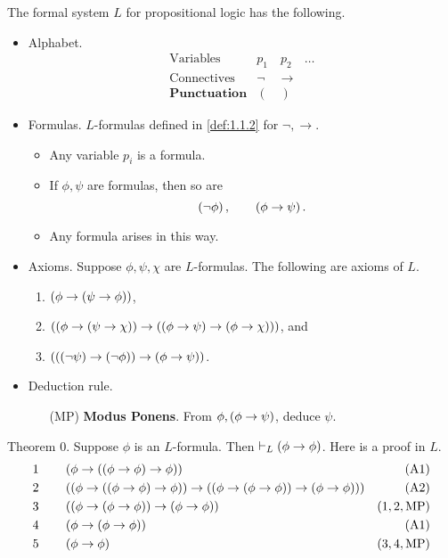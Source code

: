 \begin{definition}
The formal system $ L $ for propositional logic has the following.
\begin{itemize}
\item Alphabet.
$$
\begin{array}{ll}
\text{Variables} & p_1 \quad p_2 \quad \dots \\
\text{Connectives} & \neg \quad \rightarrow \\
\textbf{Punctuation} & ( \quad )
\end{array}
$$
\item Formulas. $ L $-formulas defined in \ref{def:1.1.2} for $ \neg, \rightarrow $.
\begin{itemize}
\item Any variable $ p_i $ is a formula.
\item If $ \phi, \psi $ are formulas, then so are
$$ \left( \neg \phi \right), \qquad \left( \phi \rightarrow \psi \right). $$
\item Any formula arises in this way.
\end{itemize}
\item Axioms. Suppose $ \phi, \psi, \chi $ are $ L $-formulas. The following are axioms of $ L $.
\begin{enumerate}[label=(A\arabic*)]
\item $ \left( \phi \rightarrow \left( \psi \rightarrow \phi \right) \right) $,
\item $ \left( \left( \phi \rightarrow \left( \psi \rightarrow \chi \right) \right) \rightarrow \left( \left( \phi \rightarrow \psi \right) \rightarrow \left( \phi \rightarrow \chi \right) \right) \right) $, and
\item $ \left( \left( \left( \neg \psi \right) \rightarrow \left( \neg \phi \right) \right) \rightarrow \left( \phi \rightarrow \psi \right) \right) $.
\end{enumerate}
\item Deduction rule.
\begin{itemize}
\item[(MP)] \textbf{Modus Ponens}. From $ \phi, \left( \phi \rightarrow \psi \right) $, deduce $ \psi $.
\end{itemize}
\end{itemize}
\end{definition}

\begin{example1}
\label{eg:1.2.3}
Theorem $ 0 $. Suppose $ \phi $ is an $ L $-formula. Then $ \vdash_L \left( \phi \rightarrow \phi \right) $. Here is a proof in $ L $.
\begin{align*}
1 \qquad & \left( \phi \rightarrow \left( \left( \phi \rightarrow \phi \right) \rightarrow \phi \right) \right) & \left( \text{A1} \right) \\
2 \qquad & \left( \left( \phi \rightarrow \left( \left( \phi \rightarrow \phi \right) \rightarrow \phi \right) \right) \rightarrow \left( \left( \phi \rightarrow \left( \phi \rightarrow \phi \right) \right) \rightarrow \left( \phi \rightarrow \phi \right) \right) \right) & \left( \text{A2} \right) \\
3 \qquad & \left( \left( \phi \rightarrow \left( \phi \rightarrow \phi \right) \right) \rightarrow \left( \phi \rightarrow \phi \right) \right) & \left( 1, 2, \text{MP} \right) \\
4 \qquad & \left( \phi \rightarrow \left( \phi \rightarrow \phi \right) \right) & \left( \text{A1} \right) \\
5 \qquad & \left( \phi \rightarrow \phi \right) & \left( 3, 4, \text{MP} \right)
\end{align*}
\end{example1}


